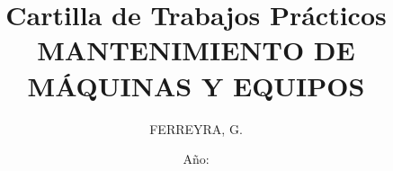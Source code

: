 \usepackage[spanish]{babel}
\usepackage{multicol}
\usepackage{tikz,svg}
\usetikzlibrary{shapes,arrows}
\usepackage{newtxtext,newtxmath}
\usepackage[formato]{toolsgf}

\allsectionsfont{\sffamily}
\newcommand{\nombre}{FERREYRA, Gustavo David }
\newcommand{\ano}{\the\year}
\newcommand{\curso}{$4^{to}1^{ra}$}
\newcommand{\materiaLong}{MANTENIMIENTO DE MÁQUINAS Y EQUIPOS}
\newcommand{\materia}{MANTENIMIENTO DE MAQ.y EQ.}
\newcommand{\logo}{images/4117}
\newcommand{\email}{gustavoferreyra@outlook.com}
\newcommand{\classroomcode}{pcm7eqa}
\newcommand{\urlqr}
{https://es.scribd.com/document/451441285}

\title{\Huge Cartilla de Trabajos Prácticos \\ 
\textbf{MANTENIMIENTO DE \\MÁQUINAS Y EQUIPOS}}
\date{Año:\the\year}
\author{FERREYRA, G.}